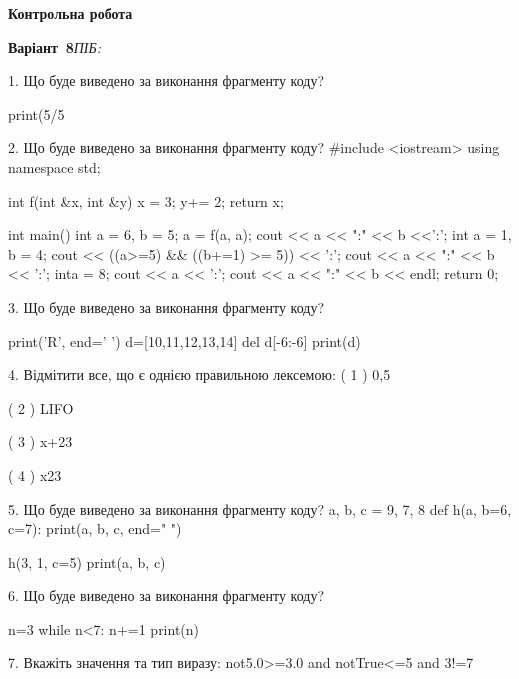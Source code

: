 \documentclass[11pt]{article}
\begin{document}
{\large\textbf{Контрольна робота}}

\textbf{Варіант \No\,8}\hfill \textit{ПІБ:}\,\underline{\hspace{60mm}}
\vspace{4mm}

1. Що буде виведено за виконання фрагменту коду?

print(5/5%
\vspace{5mm}

2. Що буде виведено за виконання фрагменту коду?
#include <iostream>
using namespace std;

int f(int &x, int &y){
    x = 3;
    y+= 2;
    return x;
}

int main(){
    int a = 6, b = 5;
    a = f(a, a);
    cout << a << ":" << b <<':';
    {
        int a = 1, b = 4;
        cout << ((a>=5) && ((b+=1) >= 5)) << ':';
        cout << a << ":" << b << ':';
    }
    {
        inta = 8;
        cout << a << ':';
    }
    cout << a << ":" << b << endl;
    return 0;
}

\vspace{5mm}

3. Що буде виведено за виконання фрагменту коду?

print('R', end=' ')
d=[10,11,12,13,14]
del d[-6:-6]
print(d)

\vspace{5mm}

4. %
Відмітити все, що є однією правильною лексемою:
( 1 ) 0,5

( 2 ) LIFO

( 3 ) x+23

( 4 ) x23
\vspace{5mm}

5. Що буде виведено за виконання фрагменту коду?
a, b, c = 9, 7, 8
def h(a, b=6, c=7):
    print(a, b, c, end=" ")

h(3, 1, c=5)
print(a, b, c)
\vspace{5mm}

6. Що буде виведено за виконання фрагменту коду?

n=3
while n<7:
    n+=1
print(n)

\vspace{5mm}

7. 
Вкажіть значення та тип виразу:
not5.0>=3.0 and notTrue<=5 and 3!=7
\vspace{5mm}
\end{document}

